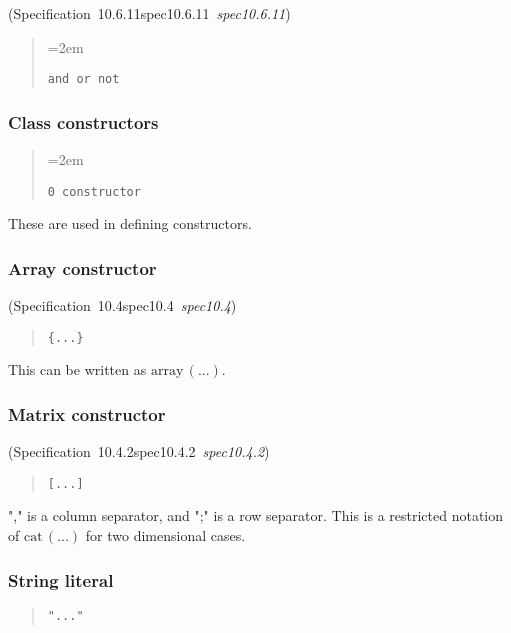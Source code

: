 \documentclass[10pt,b5paper]{article}
\def\specrefx#1#2{Specification~#1\ifx\relax#2\relax{}\else~{\it{}#2}\fi}
\def\specref#1{\specrefx{#1}{\csname spec#1\endcsname}}
\begin{document}
(\specref{10.6.11}\/)

\begin{quote}
\spaceskip=2em
\begin{verbatim}
and or not
\end{verbatim}
\end{quote}

\subsubsection*{Class constructors}

\begin{quote}
\spaceskip=2em
\begin{verbatim}
0 constructor
\end{verbatim}
\end{quote}

\noindent These are used in defining constructors.

\subsubsection*{Array constructor}
(\specref{10.4}\/)

\begin{quote}
\begin{verbatim}
{...}
\end{verbatim}
\end{quote}

\noindent This can be written as $\mathrm{array}\,(...)$.

\subsubsection*{Matrix constructor}
(\specref{10.4.2}\/)

\begin{quote}
\begin{verbatim}
[...]
\end{verbatim}
\end{quote}

\noindent "," is a column separator, and ";" is a row separator.  This
is a restricted notation of $\mathrm{cat}\,(...)$ for two dimensional
cases.

\subsubsection*{String literal}

\begin{quote}
\begin{verbatim}
"..."
\end{verbatim}
\end{quote}
\end{document}
